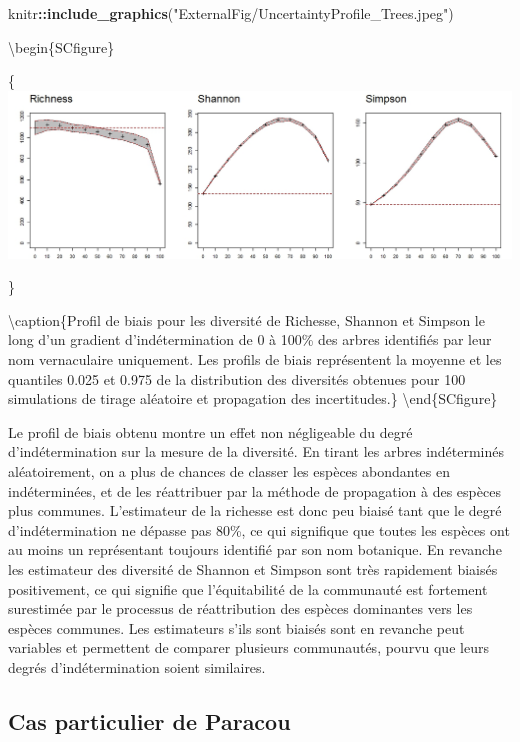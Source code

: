 \documentclass[
  11pt,
  french,
  A4paper,
  extrafontsizes,onecolumn,openright
  ]{memoir}
\newenvironment{Shaded}{\begin{snugshade}}{\end{snugshade}}
\newcommand{\KeywordTok}[1]{\textcolor[rgb]{0.13,0.29,0.53}{\textbf{#1}}}
\newcommand{\StringTok}[1]{\textcolor[rgb]{0.31,0.60,0.02}{#1}}
\newcommand{\OperatorTok}[1]{\textcolor[rgb]{0.81,0.36,0.00}{\textbf{#1}}}
\newcommand{\NormalTok}[1]{#1}
\begin{document}
\begin{Shaded}
\begin{Highlighting}[]
\NormalTok{knitr}\OperatorTok{::}\KeywordTok{include_graphics}\NormalTok{(}\StringTok{"ExternalFig/UncertaintyProfile_Trees.jpeg"}\NormalTok{)}
\end{Highlighting}
\end{Shaded}

\textbackslash{}begin\{SCfigure\}

\{\centering \includegraphics[width=0.6\linewidth]{ExternalFig/UncertaintyProfile_Trees}

\}

\textbackslash{}caption\{Profil de biais pour les diversité de Richesse,
Shannon et Simpson le long d'un gradient d'indétermination de 0 à 100\%
des arbres identifiés par leur nom vernaculaire uniquement. Les profils
de biais représentent la moyenne et les quantiles 0.025 et 0.975 de la
distribution des diversités obtenues pour 100 simulations de tirage
aléatoire et propagation des incertitudes.\}\label{fig:SimuTrees}
\textbackslash{}end\{SCfigure\}

Le profil de biais obtenu montre un effet non négligeable du degré
d'indétermination sur la mesure de la diversité. En tirant les arbres
indéterminés aléatoirement, on a plus de chances de classer les espèces
abondantes en indéterminées, et de les réattribuer par la méthode de
propagation à des espèces plus communes. L'estimateur de la richesse est
donc peu biaisé tant que le degré d'indétermination ne dépasse pas 80\%,
ce qui signifique que toutes les espèces ont au moins un représentant
toujours identifié par son nom botanique. En revanche les estimateur des
diversité de Shannon et Simpson sont très rapidement biaisés
positivement, ce qui signifie que l'équitabilité de la communauté est
fortement surestimée par le processus de réattribution des espèces
dominantes vers les espèces communes. Les estimateurs s'ils sont biaisés
sont en revanche peut variables et permettent de comparer plusieurs
communautés, pourvu que leurs degrés d'indétermination soient
similaires.

\subsection{Cas particulier de
Paracou}\label{cas-particulier-de-paracou}
\end{document}
